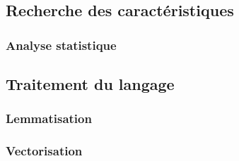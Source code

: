 \subsection{Recherche des caractéristiques}

\subsubsection{Analyse statistique}

\subsection{Traitement du langage}
    \subsubsection{Lemmatisation}
	\subsubsection{Vectorisation}
